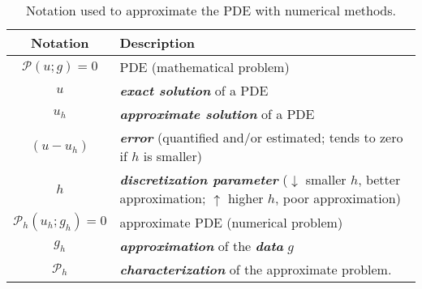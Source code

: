 \begin{table}[!htp]
    \centering
    \begin{tabular}{@{} c p{25em} @{}}
        \toprule
        \textbf{Notation} & \textbf{Description} \\
        \midrule
        $\mathcal{P}\left(u; g\right) = 0$ & PDE (mathematical problem) \\ [.5em]
        $u$ & \textbf{\emph{exact solution}} of a PDE \\ [.5em]
        $u_{h}$ & \textbf{\emph{approximate solution}} of a PDE \\ [.5em]
        $\left(u - u_{h}\right)$ & \textbf{\emph{error}} (quantified and/or estimated; tends to zero if $h$ is smaller) \\ [.5em]
        $h$ & \textbf{\emph{discretization parameter}} ($\downarrow$ smaller $h$, better approximation; $\uparrow$ higher $h$, poor approximation) \\ [.5em]
        $\mathcal{P}_{h}\left(u_{h}; g_{h}\right) = 0$ & approximate PDE (numerical problem) \\ [.5em]
        $g_{h}$ & \textbf{\emph{approximation}} of the \textbf{\emph{data}} $g$ \\ [.5em]
        $\mathcal{P}_{h}$ & \textbf{\emph{characterization}} of the approximate problem. \\
        \bottomrule
    \end{tabular}
    \caption{Notation used to approximate the PDE with numerical methods.}
\end{table}